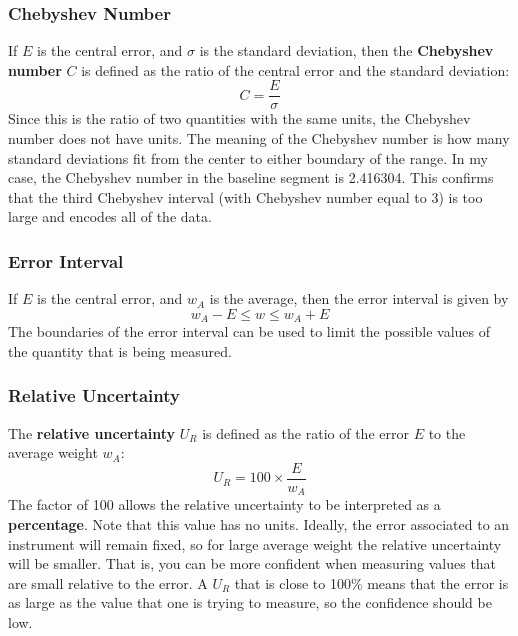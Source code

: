 \subsubsection{Chebyshev Number}
If $E$ is the central error, and $\sigma$ is the standard deviation, then the \textbf{Chebyshev number} $C$ is defined as the ratio of the central error and the standard deviation:
\begin{equation}
    C = \frac{E}{\sigma}
\end{equation}
Since this is the ratio of two quantities with the same units, the Chebyshev number does not have units. The meaning of the Chebyshev number is how many standard deviations fit from the center to either boundary of the range. In my case, the Chebyshev number in the baseline segment is 2.416304. This confirms that the third Chebyshev interval (with Chebyshev number equal to 3) is too large and encodes all of the data.
\subsubsection{Error Interval}
If $E$ is the central error, and $w_{A}$ is the average, then the error interval is given by
\begin{equation}
    w_{A} - E \leq w \leq w_{A} + E
\end{equation}
The boundaries of the error interval can be used to limit the possible values of the quantity that is being measured.
\subsubsection{Relative Uncertainty}
The \textbf{relative uncertainty} $U_{R}$ is defined as the ratio of the error $E$ to the average weight $w_{A}$:
\begin{equation}
    U_{R} = 100 \times \frac{E}{w_{A}}
\end{equation}
The factor of 100 allows the relative uncertainty to be interpreted as a \textbf{percentage}. Note that this value has no units. Ideally, the error associated to an instrument will remain fixed, so for large average weight the relative uncertainty will be smaller. That is, you can be more confident when measuring values that are small relative to the error. A $U_{R}$ that is close to 100\% means that the error is as large as the value that one is trying to measure, so the confidence should be low.

